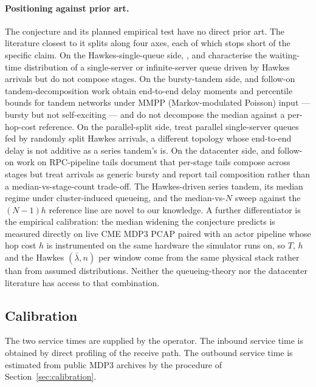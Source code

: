 \documentclass[11pt]{article}
\begin{document}
\paragraph{Positioning against prior art.} The conjecture and its planned empirical test have no direct prior art. The literature closest to it splits along four axes, each of which stops short of the specific claim. On the Hawkes-single-queue side, \citet{dawpender2018queues}, \citet{koopsboxmamandjes2018} and \citet{chenblanchet2021} characterise the waiting-time distribution of a single-server or infinite-server queue driven by Hawkes arrivals but do not compose stages. On the bursty-tandem side, \citet{heindl2001mmpp} and follow-on tandem-decomposition work \citep{kimchydzinski2002mmpp} obtain end-to-end delay moments and percentile bounds for tandem networks under MMPP (Markov-modulated Poisson) input --- bursty but not self-exciting --- and do not decompose the median against a per-hop-cost reference. On the parallel-split side, \citet{gao2024hawkessplit} treat parallel single-server queues fed by randomly split Hawkes arrivals, a different topology whose end-to-end delay is not additive as a series tandem's is. On the datacenter side, \citet{deanbarroso2013tailatscale} and follow-on work on RPC-pipeline tails \citep{zhao2023parsimon} document that per-stage tails compose across stages but treat arrivals as generic bursty and report tail composition rather than a median-vs-stage-count trade-off. The Hawkes-driven series tandem, its median regime under cluster-induced queueing, and the median-vs-$N$ sweep against the $(N-1)h$ reference line are novel to our knowledge. A further differentiator is the empirical calibration: the median widening the conjecture predicts is measured directly on live CME MDP3 PCAP paired with an actor pipeline whose hop cost $h$ is instrumented on the same hardware the simulator runs on, so $T$, $h$ and the Hawkes $(\bar\lambda, n)$ per window come from the same physical stack rather than from assumed distributions. Neither the queueing-theory nor the datacenter literature has access to that combination.

\subsection{Calibration}
\label{sec:upgrade-calibration}

The two service times are supplied by the operator. The inbound service time is obtained by direct profiling of the receive path. The outbound service time is estimated from public MDP3 archives by the procedure of Section~\ref{sec:calibration}.
\end{document}
